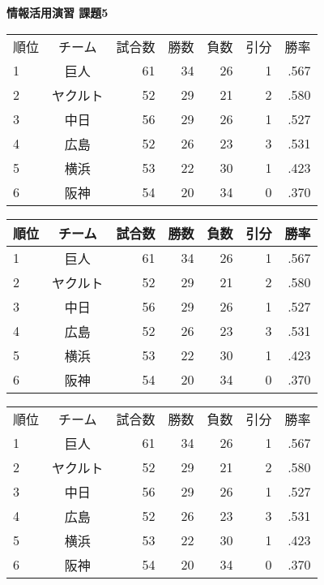 \topmargin=-1.5cm
\textwidth=17cm
\textheight=25cm
\oddsidemargin=-0.5cm
\evensidemargin=-0.5cm


\begin {center}
  \Large\bf 情報活用演習 課題5
\end {center}
\begin{tabular}{lcrrrrr}
  順位& チーム& 試合数& 勝数& 負数& 引分& 勝率\\
  1 & 巨人& 61 & 34 & 26 & 1 & .567 \\
  2 & ヤクルト& 52 & 29 & 21 & 2 & .580 \\
  3 & 中日& 56 & 29 & 26 & 1 & .527 \\
  4 & 広島& 52 & 26 & 23 & 3 & .531 \\
  5 & 横浜& 53 & 22 & 30 & 1 & .423 \\
  6 & 阪神& 54 & 20 & 34 & 0 & .370
\end{tabular}


\begin{tabular}{|l|c|r|r|r|r|r|}
  \hline
  順位& チーム& 試合数& 勝数& 負数& 引分& 勝率\\
  \hline
  1 & 巨人& 61 & 34 & 26 & 1 & .567 \\
  \hline
  2 & ヤクルト& 52 & 29 & 21 & 2 & .580 \\
  \hline
  3 & 中日& 56 & 29 & 26 & 1 & .527 \\
  \hline
  4 & 広島& 52 & 26 & 23 & 3 & .531 \\
  \hline
  5 & 横浜& 53 & 22 & 30 & 1 & .423 \\
  \hline
  6 & 阪神& 54 & 20 & 34 & 0 & .370 \\
  \hline
\end{tabular}


\begin{tabular}{|l|c|r|r|r|r|r|}
  \hline
  順位& チーム& 試合数& 勝数& 負数& 引分& 勝率\\
  \cline{2-7}
  1 & 巨人& 61 & 34 & 26 & 1 & .567 \\
  \cline{1-5}
  2 & ヤクルト& 52 & 29 & 21 & 2 & .580 \\
  \hline
  3 & 中日& 56 & 29 & 26 & 1 & .527 \\
  \hline
  4 & 広島& 52 & 26 & 23 & 3 & .531 \\
  \hline
  5 & 横浜& 53 & 22 & 30 & 1 & .423 \\
  \hline
  6 & 阪神& 54 & 20 & 34 & 0 & .370 \\
  \hline
\end{tabular}



